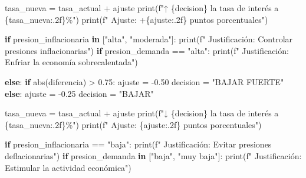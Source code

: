 \documentclass[
  doc,
  floatsintext,
  longtable,
  a4paper,
  nolmodern,
  notxfonts,
  notimes,
  12pt,
  colorlinks=true,linkcolor=blue,citecolor=blue,urlcolor=blue]{apa7}
\newenvironment{Shaded}{\begin{snugshade}}{\end{snugshade}}
\newcommand{\BuiltInTok}[1]{\textcolor[rgb]{0.00,0.23,0.31}{#1}}
\newcommand{\ControlFlowTok}[1]{\textcolor[rgb]{0.00,0.23,0.31}{\textbf{#1}}}
\newcommand{\FloatTok}[1]{\textcolor[rgb]{0.68,0.00,0.00}{#1}}
\newcommand{\KeywordTok}[1]{\textcolor[rgb]{0.00,0.23,0.31}{\textbf{#1}}}
\newcommand{\NormalTok}[1]{\textcolor[rgb]{0.00,0.23,0.31}{#1}}
\newcommand{\OperatorTok}[1]{\textcolor[rgb]{0.37,0.37,0.37}{#1}}
\newcommand{\SpecialCharTok}[1]{\textcolor[rgb]{0.37,0.37,0.37}{#1}}
\newcommand{\SpecialStringTok}[1]{\textcolor[rgb]{0.13,0.47,0.30}{#1}}
\newcommand{\StringTok}[1]{\textcolor[rgb]{0.13,0.47,0.30}{#1}}
\begin{document}
\begin{Shaded}
\begin{Highlighting}[]
\NormalTok{            tasa\_nueva }\OperatorTok{=}\NormalTok{ tasa\_actual }\OperatorTok{+}\NormalTok{ ajuste}
            \BuiltInTok{print}\NormalTok{(}\SpecialStringTok{f"↑ }\SpecialCharTok{\{}\NormalTok{decision}\SpecialCharTok{\}}\SpecialStringTok{ la tasa de interés a }\SpecialCharTok{\{}\NormalTok{tasa\_nueva}\SpecialCharTok{:.2f\}}\SpecialStringTok{\%"}\NormalTok{)}
            \BuiltInTok{print}\NormalTok{(}\SpecialStringTok{f"  Ajuste: +}\SpecialCharTok{\{}\NormalTok{ajuste}\SpecialCharTok{:.2f\}}\SpecialStringTok{ puntos porcentuales"}\NormalTok{)}
            
            \ControlFlowTok{if}\NormalTok{ presion\_inflacionaria }\KeywordTok{in}\NormalTok{ [}\StringTok{"alta"}\NormalTok{, }\StringTok{"moderada"}\NormalTok{]:}
                \BuiltInTok{print}\NormalTok{(}\SpecialStringTok{f"  Justificación: Controlar presiones inflacionarias"}\NormalTok{)}
            \ControlFlowTok{if}\NormalTok{ presion\_demanda }\OperatorTok{==} \StringTok{"alta"}\NormalTok{:}
                \BuiltInTok{print}\NormalTok{(}\SpecialStringTok{f"  Justificación: Enfriar la economía sobrecalentada"}\NormalTok{)}
        
        \ControlFlowTok{else}\NormalTok{:}
            \ControlFlowTok{if} \BuiltInTok{abs}\NormalTok{(diferencia) }\OperatorTok{\textgreater{}} \FloatTok{0.75}\NormalTok{:}
\NormalTok{                ajuste }\OperatorTok{=} \OperatorTok{{-}}\FloatTok{0.50}
\NormalTok{                decision }\OperatorTok{=} \StringTok{"BAJAR FUERTE"}
            \ControlFlowTok{else}\NormalTok{:}
\NormalTok{                ajuste }\OperatorTok{=} \OperatorTok{{-}}\FloatTok{0.25}
\NormalTok{                decision }\OperatorTok{=} \StringTok{"BAJAR"}
            
\NormalTok{            tasa\_nueva }\OperatorTok{=}\NormalTok{ tasa\_actual }\OperatorTok{+}\NormalTok{ ajuste}
            \BuiltInTok{print}\NormalTok{(}\SpecialStringTok{f"↓ }\SpecialCharTok{\{}\NormalTok{decision}\SpecialCharTok{\}}\SpecialStringTok{ la tasa de interés a }\SpecialCharTok{\{}\NormalTok{tasa\_nueva}\SpecialCharTok{:.2f\}}\SpecialStringTok{\%"}\NormalTok{)}
            \BuiltInTok{print}\NormalTok{(}\SpecialStringTok{f"  Ajuste: }\SpecialCharTok{\{}\NormalTok{ajuste}\SpecialCharTok{:.2f\}}\SpecialStringTok{ puntos porcentuales"}\NormalTok{)}
            
            \ControlFlowTok{if}\NormalTok{ presion\_inflacionaria }\OperatorTok{==} \StringTok{"baja"}\NormalTok{:}
                \BuiltInTok{print}\NormalTok{(}\SpecialStringTok{f"  Justificación: Evitar presiones deflacionarias"}\NormalTok{)}
            \ControlFlowTok{if}\NormalTok{ presion\_demanda }\KeywordTok{in}\NormalTok{ [}\StringTok{"baja"}\NormalTok{, }\StringTok{"muy baja"}\NormalTok{]:}
                \BuiltInTok{print}\NormalTok{(}\SpecialStringTok{f"  Justificación: Estimular la actividad económica"}\NormalTok{)}
        

\end{Highlighting}
\end{Shaded}
\end{document}
